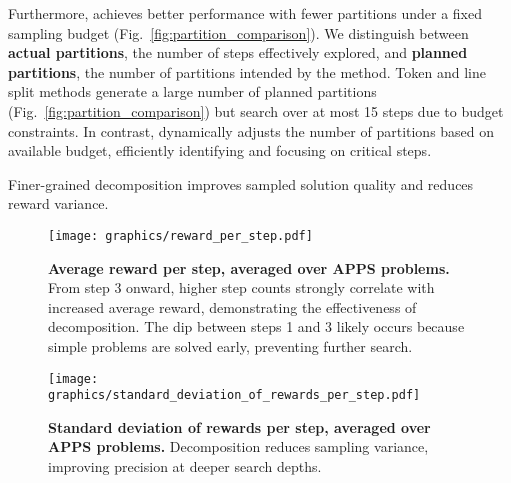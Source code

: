Furthermore, \decomp achieves better performance with fewer partitions under a fixed sampling budget (Fig.~\ref{fig:partition_comparison}). We distinguish between \textbf{actual partitions}, the number of steps effectively explored, and \textbf{planned partitions}, the number of partitions intended by the method. Token and line split methods generate a large number of planned partitions (Fig.~\ref{fig:partition_comparison}) but search over at most 15 steps due to budget constraints. In contrast, \decomp dynamically adjusts the number of partitions based on available budget, efficiently identifying and focusing on critical steps.

\begin{tcolorbox}[title=Takeaway: Decomposition and sample quality,boxsep=0.5mm,  colframe=low,]\footnotesize{
    Finer-grained decomposition improves sampled solution quality and reduces reward variance.}
\end{tcolorbox}

\begin{figure}
    \centering
    \vspace{-0.3cm}\texttt{[image: graphics/reward\_per\_step.pdf]}
    \vspace{-0.3cm}
    \caption{\textbf{Average reward per step, averaged over APPS problems.} From step 3 onward, higher step counts strongly correlate with increased average reward, demonstrating the effectiveness of decomposition. The dip between steps 1 and 3 likely occurs because simple problems are solved early, preventing further search.}
    \vspace{-0.3cm}
    \label{fig:avg_reward_step}
\end{figure}

\begin{figure}
    \centering
\vspace{-0.3cm}    
\texttt{[image: graphics/standard\_deviation\_of\_rewards\_per\_step.pdf]}
    \vspace{-0.3cm}
    \caption{\textbf{Standard deviation of rewards per step, averaged over APPS problems.} Decomposition reduces sampling variance, improving precision at deeper search depths.}
    \label{fig:std_per_step}
\end{figure}

